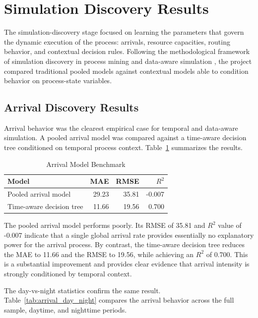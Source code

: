 \section{Simulation Discovery Results}
\label{sec:simulation_discovery_results}

The simulation-discovery stage focused on learning the parameters that govern the dynamic execution of the process: arrivals, resource capacities, routing behavior, and contextual decision rules. Following the methodological framework of simulation discovery in process mining and data-aware simulation \cite{PMRozinat2009,Camargo2020,lopez2024,Vinci2026prosit,mannhardt2023stochasticProcessesModelling}, the project compared traditional pooled models against contextual models able to condition behavior on process-state variables.

\subsection{Arrival Discovery Results}
\label{sec:arrival_discovery_results}

Arrival behavior was the clearest empirical case for temporal and data-aware simulation. A pooled arrival model was compared against a time-aware decision tree conditioned on temporal process context. Table~\ref{tab:arrival_model_benchmark} summarizes the results.

\begin{table}[h!]
\centering
\caption{Arrival Model Benchmark}
\label{tab:arrival_model_benchmark}
\begin{tabular}{lrrr}
\toprule
Model & MAE & RMSE & $R^2$ \\
\midrule
Pooled arrival model & 29.23 & 35.81 & -0.007 \\
Time-aware decision tree & 11.66 & 19.56 & 0.700 \\
\bottomrule
\end{tabular}
\end{table}

The pooled arrival model performs poorly. Its RMSE of 35.81 and $R^2$ value of -0.007 indicate that a single global arrival rate provides essentially no explanatory power for the arrival process. By contrast, the time-aware decision tree reduces the MAE to 11.66 and the RMSE to 19.56, while achieving an $R^2$ of 0.700. This is a substantial improvement and provides clear evidence that arrival intensity is strongly conditioned by temporal context.

The day-vs-night statistics confirm the same result. Table~\ref{tab:arrival_day_night} compares the arrival behavior across the full sample, daytime, and nighttime periods.

